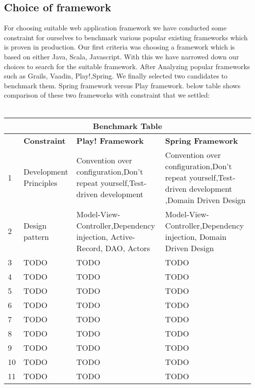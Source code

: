 \subsection{Choice of framework}
For choosing suitable web application framework we have conducted some  constraint for ourselves to benchmark various popular existing frameworks which is proven in production. Our first criteria was choosing a framework which is based on either Java, Scala, Javascript. With this we have narrowed down our choices to search for the suitable framework. After Analyzing popular frameworks such as Grails, Vaadin, Play!,Spring. We finally selected two candidates to benchmark them. Spring framework versus Play framework. below table shows comparison of these two frameworks with constraint that we settled:\\\\

\begin{tabular}{ |p{1cm}||p{3cm}|p{6cm}|p{6cm}|  }
 \hline
 \multicolumn{4}{|c|}{\textbf{Benchmark Table}} \\
 \hline
 ~ & \textbf{Constraint} & \textbf{Play! Framework} & \textbf{Spring Framework}\\
 \hline
 1   & Development Principles & Convention over configuration,Don't repeat yourself,Test-driven development & Convention over configuration,Don't repeat yourself,Test-driven development ,Domain Driven Design   \\
 \hline
 2 & Design pattern &   Model-View-Controller,Dependency injection, Active-Record, DAO, Actors  & Model-View-Controller,Dependency injection, Domain Driven Design \\
 \hline
 3 &TODO & TODO&  TODO\\
 \hline
 4   &TODO & TODO &  TODO\\
 \hline
 5&   TODO  &TODO&TODO\\
 \hline
 6&   TODO  & TODO&TODO\\
 \hline
 7&   TODO & TODO&TODO\\
 \hline
 8&   TODO  & TODO&TODO\\
 \hline
 9&   TODO  & TODO & TODO\\
 \hline
 10&   TODO & TODO & TODO\\
 \hline
 11&   TODO & TODO&TODO\\
 \hline
\end{tabular}



